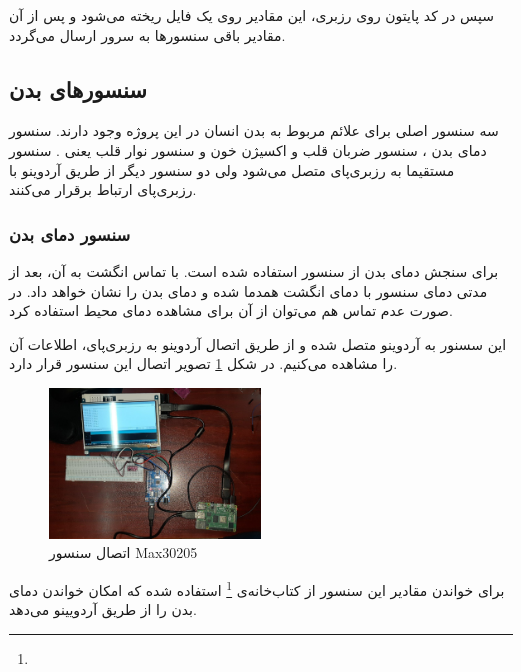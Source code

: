 سپس در کد پایتون روی رزبری، این مقادیر روی یک فایل ریخته می‌شود و پس از آن  مقادیر باقی سنسورها به سرور ارسال می‌گردد.




\subsection{سنسورهای بدن}

سه سنسور اصلی برای علائم مربوط به بدن انسان در این پروژه وجود دارند. سنسور دمای بدن ، سنسور  ضربان قلب و اکسیژن خون  و سنسور نوار قلب یعنی . سنسور  مستقیما به رزبری‌پای متصل می‌شود ولی دو سنسور دیگر از طریق آردوینو با رزبری‌پای ارتباط برقرار می‌کنند.


\subsubsection{سنسور دمای بدن}



برای سنجش دمای بدن از سنسور  استفاده شده است. با تماس انگشت به آن، بعد از مدتی دمای سنسور با دمای انگشت همدما شده و دمای بدن را نشان خواهد داد. در صورت عدم تماس هم می‌توان از آن برای مشاهده دمای محیط استفاده کرد.

این سسنور به آردوینو متصل شده و از طریق اتصال آردوینو به رزبری‌پای، اطلاعات آن را مشاهده می‌کنیم. در شکل \ref{fig:4} تصویر اتصال این سنسور قرار دارد.

\begin{figure}[h]
	\centering
	\includegraphics[width=0.5\textwidth]{figs/max30205.jpg}
	
	\caption{اتصال سنسور Max30205}
	\label{fig:4}
\end{figure}


برای خواندن مقادیر این سنسور از کتاب‌خانه‌ی
\footnote{}
 استفاده شده که امکان خواندن دمای بدن را از طریق آردویینو می‌دهد.

